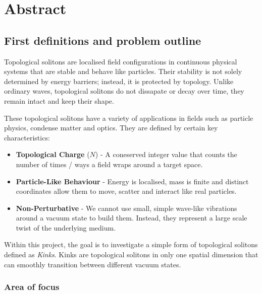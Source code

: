 \documentclass[a4paper]{report}
\begin{document}
\maketitle
\tableofcontents
\setcounter{section}{0}

\newpage

\chapter{Abstract}
\section{First definitions and problem outline}

Topological solitons are localised field configurations in continuous physical systems that are stable and behave like particles. Their stability is not solely determined by energy barriers; instead, it is protected by topology. Unlike ordinary waves, topological solitons do not dissapate or decay over time, they remain intact and keep their shape. 

These topological solitons have a variety of applications in fields such as particle physics, condense matter and optics. They are defined by certain key characteristics:

\begin{itemize}
  \item \textbf{Topological Charge } (\(N\)) - A coneserved integer value that counts the number of times / ways a field wraps around a target space.
  \item \textbf{Particle-Like Behaviour} - Energy is localised, mass is finite and distinct coordinates allow them to move, scatter and interact like real particles.
  \item \textbf{Non-Perturbative} - We cannot use small, simple wave-like vibrations around a vacuum state to build them. Instead, they represent a large scale twist of the underlying medium.
\end{itemize}

Within this project, the goal is to investigate a simple form of topological solitons defined as \emph{Kinks}. Kinks are topological solitons in only one spatial dimension that can smoothly transition between different vacuum states.

\subsection{Area of focus}
\end{document}
